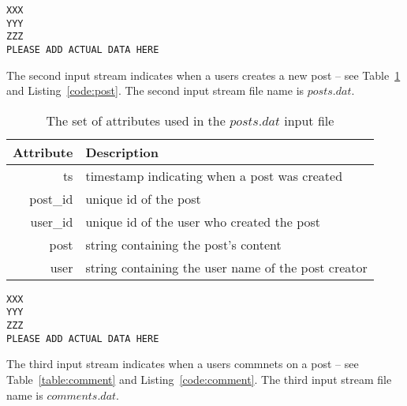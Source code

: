 \documentclass{sig-alternate}
\begin{document}
\lstset{}
\begin{lstlisting}[float=ht,caption={First line from the $friendships.dat$ file -- one attribute per line of listing},label={code:friend}]
XXX
YYY
ZZZ
PLEASE ADD ACTUAL DATA HERE
\end{lstlisting}	

The second input stream indicates when a users creates a new post -- see Table~\ref{table:post} and Listing~\ref{code:post}. The second input stream file name is $posts.dat$.

\begin{table}[ht]
	\caption{The set of attributes used in the $posts.dat$ input file}
	\centering 
	\begin{tabular}{r p{5.2cm}}
		\toprule
		Attribute		&	 Description\\
		\midrule
		ts			&	timestamp indicating when a post was created\\[2ex]
		post\_id	&	unique id of the post\\[2ex]
		user\_id	&	unique id of the user who created the post\\[2ex]		
		post		& 	string containing the post's content\\[2ex]		
		user		&   string containing the user name of the post creator\\[2ex]
		\bottomrule 
	\end{tabular}
	\label{table:post}
\end{table}



\lstset{}
\begin{lstlisting}[float=ht,caption={First line from the $posts.dat$ file -- one attribute per line of listing},label={code:post}]
XXX
YYY
ZZZ
PLEASE ADD ACTUAL DATA HERE
\end{lstlisting}

The third input stream indicates when a users commnets on a post -- see Table~\ref{table:comment} and Listing~\ref{code:comment}. The third input stream file name is $comments.dat$.
\end{document}

